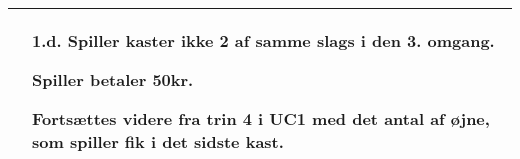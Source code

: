 \documentclass[class=article, crop=false]{standalone}
\begin{document}
\begin{table}[H]
\begin{tabularx}{\textwidth}{|l|X|}
                                    & \textbf{1.d.} Spiller kaster ikke 2 af samme slags i den 3. omgang.
                                    \begin{enumerate} \begin{tabenum}
                                      \item Spiller betaler 50kr.
                                      \item Fortsættes videre fra trin 4 i UC1 med det antal af øjne, som spiller fik i det sidste kast.
                                    \end{tabenum} \end{enumerate}
                                    \\




            \hline

        \end{tabularx}


    \end{table}
\end{document}
